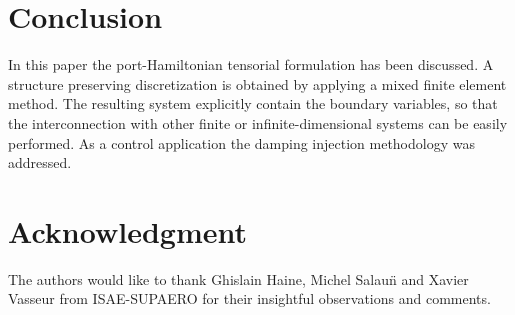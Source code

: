 \documentclass[letterpaper, 10 pt, conference]{ieeeconf}
\begin{document}
\section{Conclusion}
In this paper the port-Hamiltonian tensorial formulation has been discussed. A structure preserving discretization is obtained by applying a mixed finite element method. The resulting system explicitly contain the boundary variables, so that the interconnection with other finite or infinite-dimensional systems can be easily performed. As a control application the damping injection methodology was addressed.








\section*{Acknowledgment}
The authors would like to thank Ghislain Haine, Michel Salau\"n and Xavier Vasseur from ISAE-SUPAERO for their insightful observations and comments.




%
%
\end{document}

